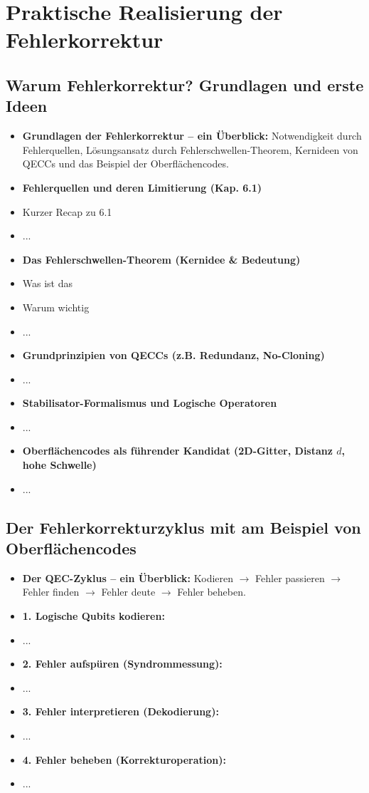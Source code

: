 \section{Praktische Realisierung der Fehlerkorrektur}

\subsection{Warum Fehlerkorrektur? Grundlagen und erste Ideen}
\begin{itemize}
    \item \textbf{Grundlagen der Fehlerkorrektur -- ein Überblick:} Notwendigkeit durch Fehlerquellen, Lösungsansatz durch Fehlerschwellen-Theorem, Kernideen von QECCs und das Beispiel der Oberflächencodes.
    \item \textbf{Fehlerquellen und deren Limitierung (Kap. 6.1)}
    \item Kurzer Recap zu 6.1
    \item ...
    \item \textbf{Das Fehlerschwellen-Theorem (Kernidee \& Bedeutung)}
    \item Was ist das
    \item Warum wichtig
    \item ...
    \item \textbf{Grundprinzipien von QECCs (z.B. Redundanz, No-Cloning)}
    \item ...
    \item \textbf{Stabilisator-Formalismus und Logische Operatoren}
    \item ...
    \item \textbf{Oberflächencodes als führender Kandidat (2D-Gitter, Distanz $d$, hohe Schwelle)}
    \item ...
\end{itemize}

\subsection{Der Fehlerkorrekturzyklus mit am Beispiel von Oberflächencodes}
\begin{itemize}
    \item \textbf{Der QEC-Zyklus -- ein Überblick:} Kodieren $\rightarrow$ Fehler passieren $\rightarrow$ Fehler finden $\rightarrow$ Fehler deute $\rightarrow$ Fehler beheben.
    \item \textbf{1. Logische Qubits kodieren:}
    \item ...
    \item \textbf{2. Fehler aufspüren (Syndrommessung):}
    \item ...
    \item \textbf{3. Fehler interpretieren (Dekodierung):}
    \item ...
    \item \textbf{4. Fehler beheben (Korrekturoperation):}
    \item ...
\end{itemize}

